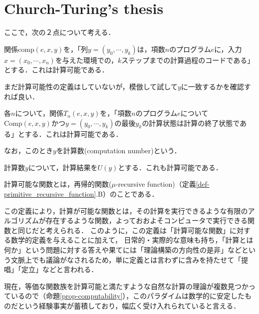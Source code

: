 \documentclass[uplatex, 12pt, dvipdfmx]{jsreport}
\begin{document}
\section{Church-Turing's thesis}

ここで，次の２点について考える．
\begin{proposition}[関係comp]
    関係$\mathrm{comp}(e,x,y)$を，「列$y=(y_0,\cdots,y_k)$は，項数$n$のプログラム$e$に，入力$x=(x_0,\cdots,x_n)$を与えた環境での，$k$ステップまでの計算過程のコードである」とする．これは計算可能である．
\end{proposition}
まだ計算可能性の定義はしていないが，模倣して試して$y$に一致するかを確認すれば良い．
\begin{proposition}
    各$n$について，関係$T_n(e,x,y)$を，「項数$n$のプログラム$e$について$\mathrm{Comp}(e,x,y)$かつ$y=(y_0,\cdots,y_k)$の最後$y_k$の計算状態は計算の終了状態である」とする．これは計算可能である．

    なお，このとき$y$を計算数(computation number)という．
\end{proposition}
\begin{proposition}
    計算数$y$について，計算結果を$U(y)$とする．これも計算可能である．
\end{proposition}

\begin{definition}\label{def-Church-Turing's thesis}
    計算可能な関数とは，再帰的関数($\mu$-recursive function)（定義\ref{def-primitive_recursive_function}.B）のことである．
\end{definition}
\begin{remark}
    この定義により，計算が可能な関数とは，その計算を実行できるような有限のアルゴリズムが存在するような関数，よっておおよそコンピュータで実行できる関数と同じだと考えられる．
    このように，この定義は「計算可能な関数」に対する数学的定義を与えることに加えて，
    日常的・実際的な意味も持ち，「計算とは何か」という問題に対する答えや果てには「理論構築の方向性の是非」などという文脈上でも議論がなされるため，単に定義とは言わずに含みを持たせて「提唱」「定立」などと言われる．

    現在，等価な関数族を計算可能と満たすような自然な計算の理論が複数見つかっているので（命題\ref{prop-computability}），このパラダイムは数学的に安定したものだという経験事実が蓄積しており，幅広く受け入れられていると言える．
\end{remark}
\end{document}
